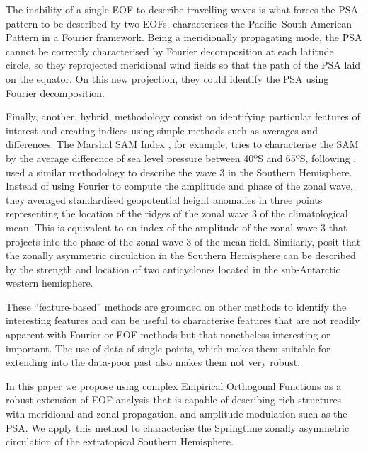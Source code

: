 \documentclass[smallextended]{svjour3}       %
\begin{document}
The inability of a single EOF to describe travelling waves is what forces the PSA pattern to be described by two EOFs. \citet{irving2016} characterises the Pacific--South American Pattern in a Fourier framework. Being a meridionally propagating mode, the PSA cannot be correctly characterised by Fourier decomposition at each latitude circle, so they reprojected meridional wind fields so that the path of the PSA laid on the equator. On this new projection, they could identify the PSA using Fourier decomposition.

Finally, another, hybrid, methodology consist on identifying particular features of interest and creating indices using simple methods such as averages and differences. The Marshal SAM Index \citep{marshall2003}, for example, tries to characterise the SAM by the average difference of sea level pressure between 40ºS and 65ºS, following \citet{gong1999}. \citet{raphael2004} used a similar methodology to describe the wave 3 in the Southern Hemisphere. Instead of using Fourier to compute the amplitude and phase of the zonal wave, they averaged standardised geopotential height anomalies in three points representing the location of the ridges of the zonal wave 3 of the climatological mean. This is equivalent to an index of the amplitude of the zonal wave 3 that projects into the phase of the zonal wave 3 of the mean field. Similarly, \citet{hobbs2010} posit that the zonally asymmetric circulation in the Southern Hemisphere can be described by the strength and location of two anticyclones located in the sub-Antarctic western hemisphere.

These ``feature-based'' methods are grounded on other methods to identify the interesting features and can be useful to characterise features that are not readily apparent with Fourier or EOF methods but that nonetheless interesting or important. The use of data of single points, which makes them suitable for extending into the data-poor past also makes them not very robust.

In this paper we propose using complex Empirical Orthogonal Functions \citep{horel1984} as a robust extension of EOF analysis that is capable of describing rich structures with meridional and zonal propagation, and amplitude modulation such as the PSA. We apply this method to characterise the Springtime zonally asymmetric circulation of the extratopical Southern Hemisphere.

\end{document}
